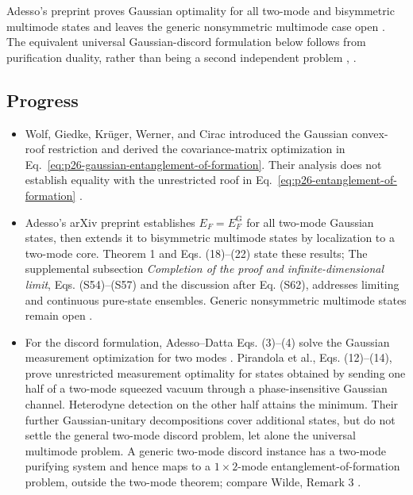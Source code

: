 Adesso's preprint proves Gaussian optimality for all two-mode and bisymmetric multimode states and leaves the generic nonsymmetric multimode case open . The equivalent universal Gaussian-discord formulation below follows from purification duality, rather than being a second independent problem , .

\subsection*{Progress}

\begin{itemize}
  \item Wolf, Giedke, Kr\"uger, Werner, and Cirac introduced the Gaussian
  convex-roof restriction and derived the covariance-matrix optimization in
  Eq.~\eqref{eq:p26-gaussian-entanglement-of-formation}.  Their analysis does
  not establish equality with the unrestricted roof in
  Eq.~\eqref{eq:p26-entanglement-of-formation}
  .

  \item Adesso's arXiv preprint establishes $E_F=E_F^{\mathrm G}$ for all two-mode Gaussian states, then extends it to bisymmetric multimode states by localization to a two-mode core. Theorem 1 and Eqs. (18)--(22) state these results; The supplemental subsection \emph{Completion of the proof and infinite-dimensional limit}, Eqs. (S54)--(S57) and the discussion after Eq. (S62), addresses limiting and continuous pure-state ensembles. Generic nonsymmetric multimode states remain open .

  \item For the discord formulation, Adesso--Datta Eqs. (3)--(4) solve the Gaussian measurement optimization for two modes . Pirandola et al., Eqs. (12)--(14), prove unrestricted measurement optimality for states obtained by sending one half of a two-mode squeezed vacuum through a phase-insensitive Gaussian channel. Heterodyne detection on the other half attains the minimum. Their further Gaussian-unitary decompositions cover additional states, but do not settle the general two-mode discord problem, let alone the universal multimode problem. A generic two-mode discord instance has a two-mode purifying system and hence maps to a $1\times2$-mode entanglement-of-formation problem, outside the two-mode theorem; compare Wilde, Remark 3  .


\end{itemize}
